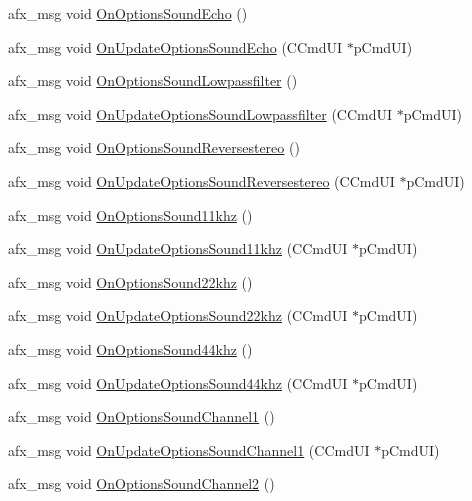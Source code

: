 \begin{DoxyCompactItemize}
\item 
afx\+\_\+msg void \mbox{\hyperlink{class_main_wnd_a8b2ccc9d323d27e0b748e0e03c544537}{On\+Options\+Sound\+Echo}} ()
\item 
afx\+\_\+msg void \mbox{\hyperlink{class_main_wnd_a9b5182cec889a64c08fdd74638ef5fd9}{On\+Update\+Options\+Sound\+Echo}} (C\+Cmd\+UI $\ast$p\+Cmd\+UI)
\item 
afx\+\_\+msg void \mbox{\hyperlink{class_main_wnd_ae0615da70b0d8ad601287b6d78f3d100}{On\+Options\+Sound\+Lowpassfilter}} ()
\item 
afx\+\_\+msg void \mbox{\hyperlink{class_main_wnd_a3dce17aef080623fbfb5b044b0602cd1}{On\+Update\+Options\+Sound\+Lowpassfilter}} (C\+Cmd\+UI $\ast$p\+Cmd\+UI)
\item 
afx\+\_\+msg void \mbox{\hyperlink{class_main_wnd_a17ac28c79cacf19d1f02925b8c8ea6e3}{On\+Options\+Sound\+Reversestereo}} ()
\item 
afx\+\_\+msg void \mbox{\hyperlink{class_main_wnd_aa8de36d9ebca9c8080800573464ee464}{On\+Update\+Options\+Sound\+Reversestereo}} (C\+Cmd\+UI $\ast$p\+Cmd\+UI)
\item 
afx\+\_\+msg void \mbox{\hyperlink{class_main_wnd_a8e81270ba800c278c27501dcf4ac7cf0}{On\+Options\+Sound11khz}} ()
\item 
afx\+\_\+msg void \mbox{\hyperlink{class_main_wnd_a5b856fbd35deabdd0478f976efa1b00f}{On\+Update\+Options\+Sound11khz}} (C\+Cmd\+UI $\ast$p\+Cmd\+UI)
\item 
afx\+\_\+msg void \mbox{\hyperlink{class_main_wnd_af0c7e1b51b3b500531bbef87b56b5fe7}{On\+Options\+Sound22khz}} ()
\item 
afx\+\_\+msg void \mbox{\hyperlink{class_main_wnd_a46fd5386680b36338e706b9ca4e54694}{On\+Update\+Options\+Sound22khz}} (C\+Cmd\+UI $\ast$p\+Cmd\+UI)
\item 
afx\+\_\+msg void \mbox{\hyperlink{class_main_wnd_a3045a6a1996566e65701d44a0db19a50}{On\+Options\+Sound44khz}} ()
\item 
afx\+\_\+msg void \mbox{\hyperlink{class_main_wnd_addaa6cd2dcb4b919176fb2214e6def42}{On\+Update\+Options\+Sound44khz}} (C\+Cmd\+UI $\ast$p\+Cmd\+UI)
\item 
afx\+\_\+msg void \mbox{\hyperlink{class_main_wnd_a6a21a6e3756553868f1792f371e7c468}{On\+Options\+Sound\+Channel1}} ()
\item 
afx\+\_\+msg void \mbox{\hyperlink{class_main_wnd_a1609087341107ba7ef7ff37757cc307b}{On\+Update\+Options\+Sound\+Channel1}} (C\+Cmd\+UI $\ast$p\+Cmd\+UI)
\item 
afx\+\_\+msg void \mbox{\hyperlink{class_main_wnd_a4f31de4544cb10e41968ccabfec95422}{On\+Options\+Sound\+Channel2}} ()

\end{DoxyCompactItemize}

